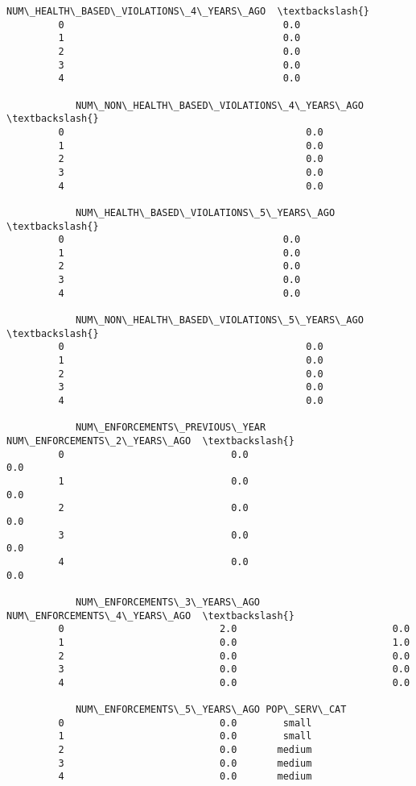 \documentclass[11pt]{article}
\begin{document}
\begin{Verbatim}[commandchars=\\\{\}]
            NUM\_HEALTH\_BASED\_VIOLATIONS\_4\_YEARS\_AGO  \textbackslash{}
         0                                      0.0   
         1                                      0.0   
         2                                      0.0   
         3                                      0.0   
         4                                      0.0   
         
            NUM\_NON\_HEALTH\_BASED\_VIOLATIONS\_4\_YEARS\_AGO  \textbackslash{}
         0                                          0.0   
         1                                          0.0   
         2                                          0.0   
         3                                          0.0   
         4                                          0.0   
         
            NUM\_HEALTH\_BASED\_VIOLATIONS\_5\_YEARS\_AGO  \textbackslash{}
         0                                      0.0   
         1                                      0.0   
         2                                      0.0   
         3                                      0.0   
         4                                      0.0   
         
            NUM\_NON\_HEALTH\_BASED\_VIOLATIONS\_5\_YEARS\_AGO  \textbackslash{}
         0                                          0.0   
         1                                          0.0   
         2                                          0.0   
         3                                          0.0   
         4                                          0.0   
         
            NUM\_ENFORCEMENTS\_PREVIOUS\_YEAR  NUM\_ENFORCEMENTS\_2\_YEARS\_AGO  \textbackslash{}
         0                             0.0                           0.0   
         1                             0.0                           0.0   
         2                             0.0                           0.0   
         3                             0.0                           0.0   
         4                             0.0                           0.0   
         
            NUM\_ENFORCEMENTS\_3\_YEARS\_AGO  NUM\_ENFORCEMENTS\_4\_YEARS\_AGO  \textbackslash{}
         0                           2.0                           0.0   
         1                           0.0                           1.0   
         2                           0.0                           0.0   
         3                           0.0                           0.0   
         4                           0.0                           0.0   
         
            NUM\_ENFORCEMENTS\_5\_YEARS\_AGO POP\_SERV\_CAT  
         0                           0.0        small  
         1                           0.0        small  
         2                           0.0       medium  
         3                           0.0       medium  
         4                           0.0       medium  
\end{Verbatim}
            
\end{document}
